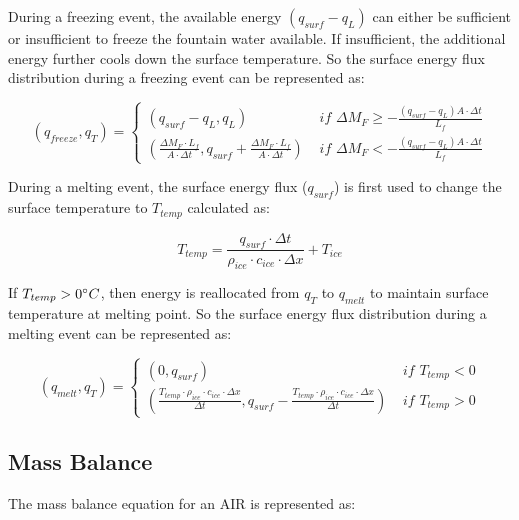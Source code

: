 \documentclass[utf8]{frontiersSCNS} %
\begin{document}
During a freezing event, the available energy $(q_{surf}-q_{L})$ can either be sufficient or insufficient to freeze the
fountain water available. If insufficient, the additional energy further cools down the surface temperature. So the
surface energy flux distribution during a freezing event can be represented as:

\begin{equation} 
    (q_{freeze}, q_{T}) = \left\{ \begin{array}{ll}
            (q_{surf}-q_{L}, q_{L}) & \textit{ if } \Delta M_{F} \geq -\frac{(q_{surf}-q_{L}) A \cdot \Delta
        t}{L_f} \\
(\frac{\Delta M_{F} \cdot L_f 
        }{A \cdot \Delta t}
        , q_{surf}+\frac{\Delta M_{F} \cdot L_f 
        }{A \cdot \Delta t}) & \textit{ if } \Delta M_{F} < -\frac{(q_{surf}-q_{L}) A \cdot \Delta
        t}{L_f}
    \end{array} \right. 
\end{equation} 

During a melting event, the surface energy flux ($q_{surf}$) is first used to change the surface temperature to
$T_{temp}$ calculated as:

\begin{equation} T_{temp} =\frac{q_{surf} \cdot \Delta t}{\rho_{ice} \cdot c_{ice} \cdot \Delta x} + T_{ice} \end{equation}

If $T_{temp} > 0 \degree C$, then energy is reallocated from $q_{T}$ to $q_{melt}$ to maintain surface temperature at
melting point. So the surface energy flux distribution during a melting event can be represented as:

\begin{equation} 
    (q_{melt}, q_{T}) = \left\{ \begin{array}{ll}
            (0, q_{surf}) & \textit{ if } T_{temp} < 0\\
            (\frac{T_{temp} \cdot \rho_{ice} \cdot c_{ice} \cdot \Delta x}{\Delta t}, q_{surf}-\frac{T_{temp} \cdot \rho_{ice} \cdot c_{ice} \cdot \Delta x}{\Delta t}  ) & \textit{ if } T_{temp} > 0
    \end{array} \right.  
\end{equation} 


\subsection{Mass Balance} 
The mass balance equation for an AIR is represented as:
\end{document}
